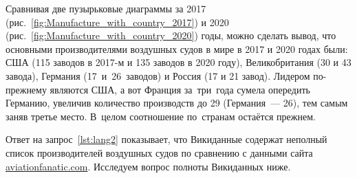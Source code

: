

Сравнивая две пузырьковые диаграммы за 2017 (рис.~\ref{fig:Manufacture_with_country_2017}) и 2020 (рис.~\ref{fig:Manufacture_with_country_2020}) годы, можно сделать вывод, что основными производителями воздушных судов в мире 
в 2017 и 2020 годах были: США (115 заводов в 2017-м и 135 заводов в 2020 году), 
Великобритания (30 и 43 завода), Германия (17~и~26~заводов) и Россия (17 и 21 завод). 
Лидером по-прежнему являются США, 
а вот Франция за~три~года сумела опередить Германию, 
увеличив количество производств до 29 (Германия~--- 26), 
тем самым заняв третье место. 
В~целом соотношение по~странам остаётся прежнем.

Ответ на запрос~\ref{lst:lang2} показывает, 
что Викиданные содержат неполный список производителей воздушных судов 
по сравнению с данными сайта \href{https://www.aviationfanatic.com/}{aviationfanatic.com}. 
Исследуем вопрос полноты Викиданных ниже. 


